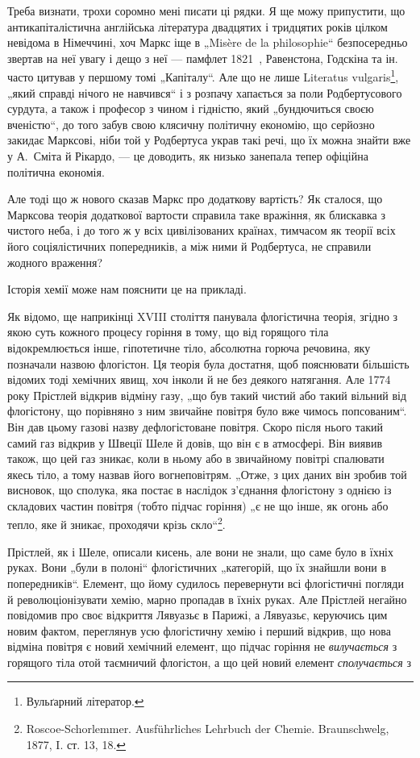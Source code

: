 
Треба визнати, трохи соромно мені писати ці рядки. Я ще можу
припустити, що антикапіталістична англійська література двадцятих і
тридцятих років цілком невідома в Німеччині, хоч Маркс іще в „Misère
de la philosophie“ безпосередньо звертав на неї увагу і дещо з неї —
памфлет 1821~, Равенстона, Годскіна та ін. часто цитував у першому
томі „Капіталу“. Але що не лише Literatus vulgaris\footnote*{
Вульґарний літератор. 
}, „який справді
нічого не навчився“ і з розпачу хапається за поли Родбертусового сурдута,
а також і професор з чином і гідністю, який „бундючиться
своєю вченістю“, до того забув свою клясичну політичну економію, що
серйозно закидає Марксові, ніби той у Родбертуса украв такі речі, що
їх можна знайти вже у А.~Сміта й Рікардо, — це доводить, як низько
занепала тепер офіційна політична економія.

Але тоді що ж нового сказав Маркс про додаткову вартість? Як
сталося, що Марксова теорія додаткової вартости справила таке вражіння,
як блискавка з чистого неба, і до того ж у всіх цивілізованих країнах,
тимчасом як теорії всіх його соціялістичних попередників, а між ними й
Родбертуса, не справили жодного враження?

Історія хемії може нам пояснити це на прикладі.

Як відомо, ще наприкінці XVIII століття панувала флогістична теорія,
згідно з якою суть кожного процесу горіння в тому, що від горящого
тіла відокремлюється інше, гіпотетичне тіло, абсолютна горюча речовина,
яку позначали назвою флогістон. Ця теорія була достатня, щоб пояснювати
більшість відомих тоді хемічних явищ, хоч інколи й не без деякого
натягання. Але 1774 року Прістлей відкрив відміну газу, „що був такий
чистий або такий вільний від флогістону, що порівняно з ним звичайне
повітря було вже чимось попсованим“. Він дав цьому газові назву дефлогістоване
повітря. Скоро після нього такий самий газ відкрив у Швеції
Шеле й довів, що він є в атмосфері. Він виявив також, що цей газ
зникає, коли в ньому або в звичайному повітрі спалювати якесь тіло, а
тому назвав його вогнеповітрям. „Отже, з цих даних він зробив той
висновок, що сполука, яка постає в наслідок з’єднання флогістону з
однією із складових частин повітря (тобто підчас горіння) „є не що
інше, як огонь або тепло, яке й зникає, проходячи крізь скло“\footnote{
Roscoe-Schorlemmer. Ausführliches Lehrbuch der Chemie. Braunschwelg, 1877,
I. ст. 13, 18.
}.

Прістлей, як і Шеле, описали кисень, але вони не знали, що саме
було в їхніх руках. Вони „були в полоні“ флогістичних „категорій, що
їх знайшли вони в попередників“. Елемент, що йому судилось перевернути
всі флогістичні погляди й революціонізувати хемію, марно пропадав
в їхніх руках. Але Прістлей негайно повідомив про своє відкриття
Лявуазьє в Парижі, а Лявуазьє, керуючись цим новим фактом, переглянув
усю флогістичну хемію і перший відкрив, що нова відміна повітря
є новий хемічний елемент, що підчас горіння не \emph{вилучається} з горящого
тіла отой таємничий флогістон, а що цей новий елемент \emph{сполучається} з
\parbreak{}  %
